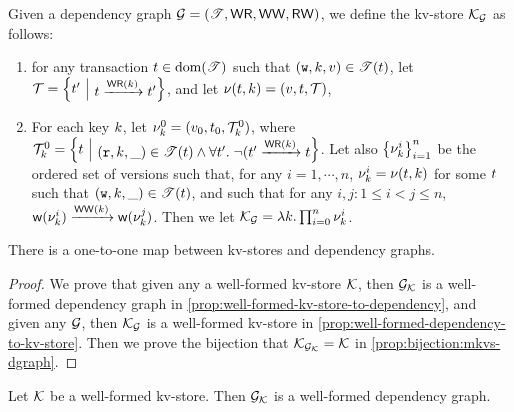 \begin{definition}
\label{def:dependency-to-kv-store}
Given a dependency graph $\mathcal{G} = (\mathscr{T}, \mathsf{WR}, \mathsf{WW}, \mathsf{RW})$, we define the kv-store $\mathcal{K}_{\mathcal{G}}$ as follows: 
\begin{enumerate}
\item for any transaction $t \in \operatorname{dom}(\mathscr{T})$ such that $(\textnormal{\texttt w}, k, v) \in \mathscr{T}(t)$, 
    let $\T = \Setcon{ \txid' }{ \txid \xrightarrow{\WR(\key)} \txid'}$, and let $\nu(t, k) = (v, t, \mathcal{T})$, 
\item For each key $k$, let $\nu_{k}^{0} = (v_0, t_0, \mathcal{T}_k^{0})$, where $\T_{k}^{0} = \Setcon{ \txid }{ (\otR, \key, \_) \in 
\TtoOp{T}(\txid) \wedge \forall \txid'.\; \neg( \txid' \xrightarrow{\WR(\key)} \txid }$. 
Let also  $\Set{ \ver_{\key}^{i} }_{i = 1}^{n}$ be the ordered set of versions such that, for any 
$i=1,\cdots,n$, $\nu_{k}^{i} = \nu(t, k)$ for some $t$ such that $(\textnormal{\texttt w}, k, \_) \in \mathscr{T}(t)$, 
and such that for any $i, j: 1 \leq i < j \leq n$, $\WTx(\ver_{\key}^{i}) \xrightarrow{\WW(\key)} \WTx(\ver_{\key}^{j})$. 
Then we let $\mathcal{K}_{\mathcal{G}}= \lambda k. \prod_{i=0}^{n} \nu_{k}^{i}$.
\end{enumerate}
\end{definition}

\begin{theorem}
\label{thm:kv2graph}
There is a one-to-one map between kv-stores and dependency graphs.
\end{theorem}
\begin{proof}
    We prove that given any a well-formed kv-store \( \mathcal{K} \), then $\mathcal{G}_{\mathcal{K}}$ is a well-formed dependency graph in \cref{prop:well-formed-kv-store-to-dependency},
    and given any \( \mathcal{G} \), then  $\mathcal{K}_{\mathcal{G}}$ is a well-formed kv-store in \cref{prop:well-formed-dependency-to-kv-store}.
    Then we prove the bijection that $\mathcal{K}_{\mathcal{G}_{\mathcal{K}}} = \mathcal{K}$ in \cref{prop:bijection:mkvs-dgraph}.
\end{proof}



\begin{proposition}
\label{prop:well-formed-kv-store-to-dependency}
Let $\mathcal{K}$ be a well-formed kv-store. Then $\mathcal{G}_{\mathcal{K}}$ is a well-formed dependency graph.
\end{proposition}


